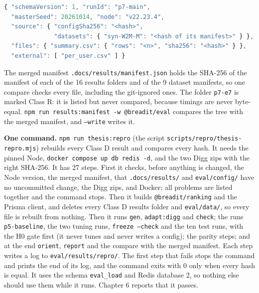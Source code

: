 \begin{lstlisting}[language=JavaScript, caption={The shape of the manifest of a run (the values in angle brackets are placeholders).}, label=lst:impl-manifest]
{ "schemaVersion": 1, "runId": "p7-main",
  "masterSeed": 20261014, "node": "v22.23.4",
  "source": { "configSha256": "<hash>",
              "datasets": { "syn-W2M-M": "<hash of its manifest>" } },
  "files": { "summary.csv": { "rows": "<n>", "sha256": "<hash>" } },
  "external": [ "per_user.csv" ] }
\end{lstlisting}

The merged manifest \texttt{.docs/results/manifest.json} holds the SHA-256 of the manifest of each of the 16 results folders and of the 9 dataset manifests, so one compare checks every file, including the git-ignored ones. The folder \texttt{p7-e7} is marked Class R: it is listed but never compared, because timings are never byte-equal. \texttt{npm run results:manifest -w @breadit/eval} compares the tree with the merged manifest, and \texttt{--write} writes it.

\textbf{One command.} \texttt{npm run thesis:repro} (the script \texttt{scripts/\allowbreak repro/\allowbreak thesis-repro.mjs}) rebuilds every Class D result and compares every hash. It needs the pinned Node, \texttt{docker compose up db redis -d}, and the two Digg zips with the right SHA-256. It has 27 steps. First it checks, before anything is changed, the Node version, the merged manifest, that \texttt{.docs/results/} and \texttt{eval/config/} have no uncommitted change, the Digg zips, and Docker; all problems are listed together and the command stops. Then it builds \texttt{@breadit/ranking} and the Prisma client, and deletes every Class D results folder and \texttt{eval/data/}, so every file is rebuilt from nothing. Then it runs \texttt{gen}, \texttt{adapt:digg} and \texttt{check}; the runs \texttt{p5-baseline}, the two tuning runs, \texttt{freeze --check} and the ten test runs, with the H0 gate first (it never tunes and never writes a config); the parity steps; and at the end \texttt{orient}, \texttt{report} and the compare with the merged manifest. Each step writes a log to \texttt{eval/results/repro/}. The first step that fails stops the command and prints the end of its log, and the command exits with 0 only when every hash is equal. It uses the schema \texttt{eval\_load} and Redis database 2, so nothing else should use them while it runs. Chapter 6 reports that it passes.

